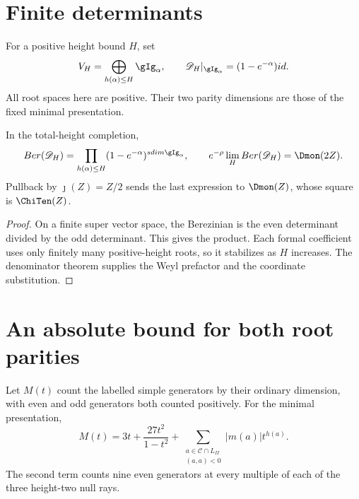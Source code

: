 \section{Finite determinants}
For a positive height bound \(H\), set
\[
 \mathcal V_H=\bigoplus_{h(\alpha)\leq H}\gIg_\alpha,
 \qquad \mathscr D_H|_{\gIg_\alpha}=(1-e^{-\alpha})\operatorname{id}.
\]
All root spaces here are positive. Their two parity dimensions are
those of the fixed minimal presentation.

\begin{proposition}
In the total-height completion,
\[
 \operatorname{Ber}(\mathscr D_H)
   =\prod_{h(\alpha)\leq H}(1-e^{-\alpha})^{\operatorname{sdim}\gIg_\alpha},
 \qquad
 e^{-\rho}\lim_H\operatorname{Ber}(\mathscr D_H)=\Dmon(2Z).
\]
Pullback by \(\jmath(Z)=Z/2\) sends the last expression to
\(\Dmon(Z)\), whose square is \(\ChiTen(Z)\).
\end{proposition}
\begin{proof}
On a finite super vector space, the Berezinian is the even determinant
divided by the odd determinant. This gives the product. Each formal
coefficient uses only finitely many positive-height roots, so it
stabilizes as \(H\) increases. The denominator theorem supplies
the Weyl prefactor and the coordinate substitution.
\end{proof}

\section{An absolute bound for both root parities}
Let \(M(t)\) count the labelled simple generators by their ordinary
dimension, with even and odd generators both counted positively.
For the minimal presentation,
\[
 M(t)=3t+\frac{27t^2}{1-t^2}
       +\sum_{\substack{a\in\mathcal C\cap L_{II}\\(a,a)<0}}
                                      |m(a)|t^{h(a)}.
\]
The second term counts nine even generators at every multiple of
each of the three height-two null rays.

